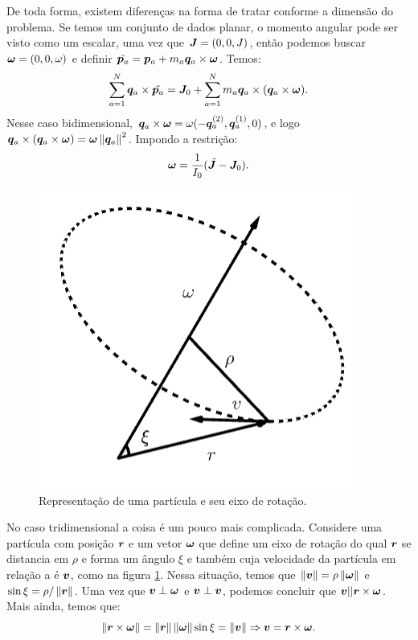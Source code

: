 De toda forma, existem diferenças na forma de tratar conforme a dimensão do problema. Se temos um conjunto de dados planar, o momento angular pode ser visto como um escalar, uma vez que $\bm J = (0, 0, J)$, então podemos buscar $\bm \omega = (0, 0, \omega)$ e definir $\tilde{\bm p_a} = \bm p_a + m_a \bm q_a \times \bm \omega$. Temos:
\begin{equation}
    \sum_{a=1}^N \bm q_a \times \tilde{\bm p_a}
    = \bm J_0 + \sum_{a=1}^N m_a \bm q_a \times (\bm q_a \times \bm \omega).
\end{equation}
Nesse caso bidimensional, $\bm q_a \times \bm \omega = \omega (-\bm q_a^{(2)}, \bm q_a^{(1)}, 0)$, e logo $\bm q_a \times (\bm q_a \times \bm \omega) = \bm \omega \left\Vert \bm q_a \right\Vert^2$. Impondo a restrição:
\begin{equation}
    \bm \omega = \dfrac{1}{I_0}(\tilde{\bm J} - \bm J_0).
\end{equation}

\begin{figure}[H]
    \centering
    \includegraphics[width=0.3\linewidth]{img/rotacao.png}
    \caption{Representação de uma partícula e seu eixo de rotação.}
    \label{fig:angular_3d}
\end{figure}

No caso tridimensional a coisa é um pouco mais complicada. Considere uma partícula com posição $\bm r$ e um vetor $\bm \omega$ que define um eixo de rotação do qual $\bm r$ se distancia em $\rho$ e forma um ângulo $\xi$ e também cuja velocidade da partícula em relação a é $\bm v$, como na figura \ref{fig:angular_3d}. Nessa situação, temos que $\left\Vert \bm v \right\Vert = \rho \left\Vert \bm \omega \right\Vert$ e $\sin \xi = \rho / \left\Vert \bm r \right\Vert$. Uma vez que $\bm v \perp \bm \omega$ e $\bm v \perp \bm v$, podemos concluir que $\bm v || \bm r \times \bm \omega$. Mais ainda, temos que:
\begin{equation}\label{eq:angular_def_omega}
    \left\Vert \bm r \times \bm \omega \right\Vert
    = \left\Vert \bm r \right\Vert \left\Vert \bm \omega \right\Vert \sin \xi = \left\Vert \bm v \right\Vert
    \Rightarrow
    \bm v = \bm r \times \bm \omega.
\end{equation}

